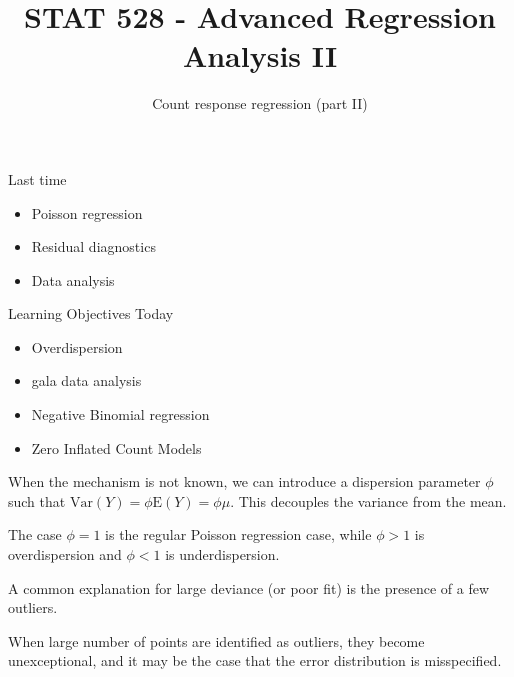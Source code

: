 \documentclass[
  ignorenonframetext,
]{beamer}
\title{STAT 528 - Advanced Regression Analysis II}
\author{Count response regression (part II)}
\date{}
\institute{Daniel J. Eck\\
Department of Statistics\\
University of Illinois}
\providecommand{\tightlist}{%
  \setlength{\itemsep}{0pt}\setlength{\parskip}{0pt}}
\begin{document}
\frame{\titlepage}

\begin{frame}
\newcommand{\R}{\mathbb{R}}
\newcommand{\Prob}{\mathbb{P}}
\newcommand{\Proj}{\textbf{P}}
\newcommand{\Hcal}{\mathcal{H}}
\newcommand{\rootn}{\sqrt{n}}
\newcommand{\p}{\mathbf{p}}
\newcommand{\E}{\text{E}}
\newcommand{\Var}{\text{Var}}
\newcommand{\Cov}{\text{Cov}}
\newcommand{\mubf}{\bm{\mu}}
\newcommand{\logit}{\text{logit}}

\newtheorem{cor}{Corollary}
\newtheorem{lem}{Lemma}
\newtheorem{thm}{Theorem}
\newtheorem{defn}{Definition}
\newtheorem{prop}{Proposition}
\end{frame}

\begin{frame}{Last time}
\protect\hypertarget{last-time}{}
\begin{itemize}
\tightlist
\item
  Poisson regression
\item
  Residual diagnostics
\item
  Data analysis
\end{itemize}
\end{frame}

\begin{frame}{Learning Objectives Today}
\protect\hypertarget{learning-objectives-today}{}
\begin{itemize}
\tightlist
\item
  Overdispersion
\item
  gala data analysis
\item
  Negative Binomial regression
\item
  Zero Inflated Count Models
\end{itemize}
\end{frame}

\begin{frame}{}
\protect\hypertarget{section}{}
When the mechanism is not known, we can introduce a dispersion parameter
\(\phi\) such that \(\mathrm{Var}(Y) = \phi \mathrm{E}(Y) = \phi\mu\).
This decouples the variance from the mean.

\vspace{12pt}

The case \(\phi = 1\) is the regular Poisson regression case, while
\(\phi > 1\) is overdispersion and \(\phi < 1\) is underdispersion.

\vspace{12pt}

A common explanation for large deviance (or poor fit) is the presence of
a few outliers.

\vspace{12pt}

When large number of points are identified as outliers, they become
unexceptional, and it may be the case that the error distribution is
misspecified.
\end{frame}
\end{document}
